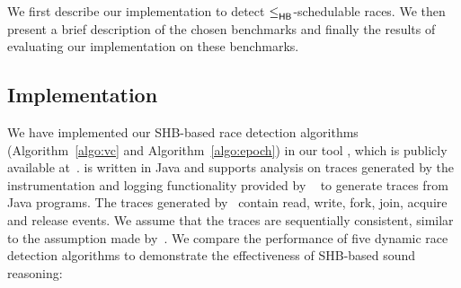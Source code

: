 
We first describe our implementation to detect
$\leq^{}_{\mathsf{HB}}$-schedulable races.
We then present a brief description of the chosen benchmarks
and finally the results of evaluating our implementation
on these benchmarks.

\subsection{Implementation}
\label{subsec:impl}

We have implemented our SHB-based race detection algorithms
(Algorithm~\ref{algo:vc} and Algorithm~\ref{algo:epoch}) 
in our tool \tool, which is publicly available at~\cite{rapid}.
{\tool} is written in Java and supports
analysis on traces generated by the instrumentation and logging 
functionality provided by \rvpredict~\cite{rvpredict} to generate traces
from Java programs.
The traces generated by \rvpredict~contain read, write,
fork, join, acquire and release events.
We assume that the traces are sequentially consistent,
similar to the assumption made by~\cite{rv2014}. 
We compare the performance of five dynamic race detection algorithms
to demonstrate the effectiveness of SHB-based sound reasoning:
